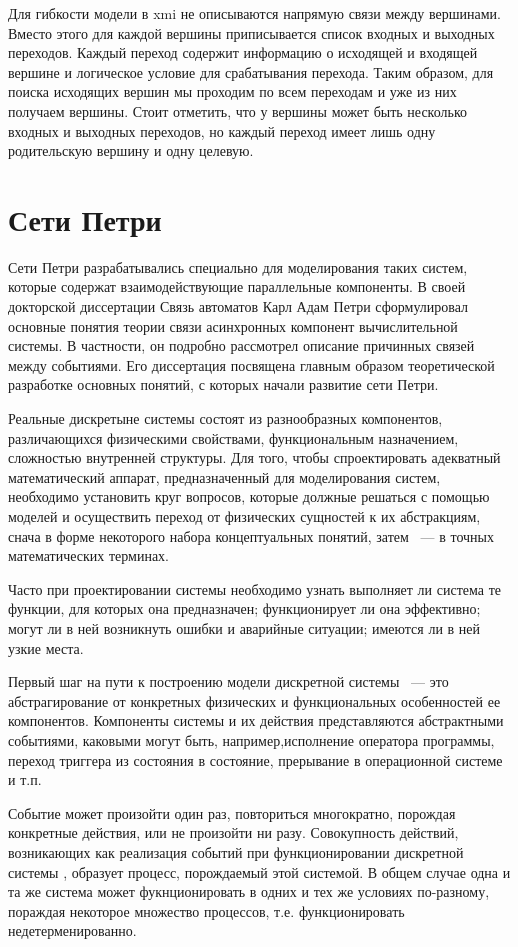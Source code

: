 Для гибкости модели в xmi не описываются напрямую связи между вершинами. Вместо этого для каждой вершины приписывается список входных и выходных переходов. Каждый переход содержит информацию о исходящей и входящей вершине и логическое условие для срабатывания перехода. Таким образом, для поиска исходящих вершин мы проходим по всем переходам и уже из них получаем вершины. Стоит отметить, что у вершины может быть несколько входных и выходных переходов, но каждый переход имеет лишь одну родительскую вершину и одну целевую.

\section{Сети Петри}

Сети Петри разрабатывались специально для моделирования таких систем, которые содержат взаимодействующие параллельные компоненты. В своей докторской диссертации Связь автоматов Карл Адам Петри сформулировал основные понятия теории связи асинхронных компонент вычислительной системы. В частности, он подробно рассмотрел описание причинных связей между событиями. Его диссертация посвящена главным образом теоретической разработке основных понятий, с которых начали развитие сети Петри. \cite{Kotov}

Реальные дискретыне системы состоят из разнообразных компонентов, различающихся физическими свойствами, функциональным назначением, сложностью внутренней структуры. Для того, чтобы спроектировать адекватный математический аппарат, предназначенный для моделирования систем, необходимо установить круг вопросов, которые должные решаться с помощью моделей и осуществить переход от физических сущностей к их абстракциям, снача в форме некоторого набора концептуальных понятий, затем ~--- в точных математических терминах.

Часто при проектировании системы необходимо узнать выполняет ли система те функции, для которых она предназначен; функционирует ли она эффективно; могут ли в ней возникнуть ошибки и аварийные ситуации; имеются ли в ней узкие места.

Первый шаг на пути к построению модели дискретной системы ~--- это абстрагирование от конкретных физических и функциональных особенностей ее компонентов. Компоненты системы и их действия представляются абстрактными событиями, каковыми могут быть, например,исполнение оператора программы, переход триггера из состояния в состояние, прерывание в операционной системе и т.п.

Событие может произойти один раз, повториться многократно, порождая конкретные действия, или не произойти ни разу. Совокупность действий, возникающих как реализация событий при функционировании дискретной системы , образует процесс, порождаемый этой системой. В общем случае одна и та же система может фукнционировать в одних и тех же условиях по-разному, пораждая некоторое множество процессов, т.е. функционировать недетерменированно.

